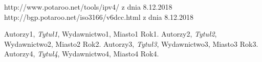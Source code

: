 \documentclass[polish,12pt,twoside,a4paper]{report}
\begin{document}




\newpage

\newpage

\newpage

\newpage

\begin{thebibliography}{6}

 http://www.potaroo.net/tools/ipv4/ z dnia 8.12.2018
 http://bgp.potaroo.net/iso3166/v6dcc.html z dnia 8.12.2018

Autorzy1, {\it Tytuł1}, Wydawnictwo1, Miasto1 Rok1.
Autorzy2, {\it Tytuł2}, Wydawnictwo2, Miasto2 Rok2.
Autorzy3, {\it Tytuł3}, Wydawnictwo3, Miasto3 Rok3.
Autorzy4, {\it Tytuł4}, Wydawnictwo4, Miasto4 Rok4.
\end{thebibliography}
\newpage
\end{document}
